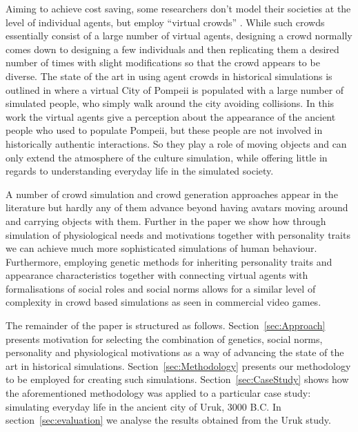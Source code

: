 Aiming to achieve cost saving, some researchers don't model their societies at the level of individual agents, but employ ``virtual crowds'' \cite{Colosseum_crowds}. While such crowds essentially consist of a large number of virtual agents, designing a crowd normally comes down to designing a few individuals and then replicating them a desired number of times with slight modifications so that the crowd appears to be diverse. The state of the art in using agent crowds in historical simulations is outlined in \cite{heritage_pompeii} where a virtual City of Pompeii is populated with a large number of simulated people, who simply walk around the city avoiding collisions. In this work the virtual agents give a perception about the appearance of the ancient people who used to populate Pompeii, but these people are not involved in historically authentic interactions. So they play a role of moving objects and can only extend the atmosphere of the culture simulation, while offering little in regards to understanding everyday life in the simulated society.

A number of crowd simulation and crowd generation approaches appear in the literature but hardly any of them advance beyond having avatars moving around and carrying objects with them.  Further in the paper we show how through simulation of physiological needs and motivations together with personality traits we can achieve much more sophisticated simulations of human behaviour. Furthermore, employing genetic methods for inheriting personality traits and appearance characteristics together with connecting virtual agents with formalisations of social roles and social norms allows for a similar level of complexity in crowd based simulations as seen in commercial video games.

The remainder of the paper is structured as follows. Section~\ref{sec:Approach} presents motivation for selecting the combination of genetics, social norms, personality and physiological motivations as a way of advancing the state of the art in historical simulations. Section~\ref{sec:Methodology} presents our methodology to be employed for creating such simulations. Section~\ref{sec:CaseStudy} shows how the aforementioned methodology was applied to a particular case study: simulating everyday life in the ancient city of Uruk, 3000 B.C. In section~\ref{sec:evaluation} we analyse the results obtained from the Uruk study. %
 


